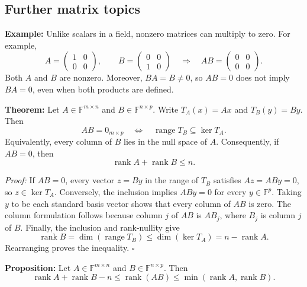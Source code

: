 \documentclass[a4paper,11pt,abstract=true]{scrartcl}
\theoremstyle{dotlessP}
\theoremstyle{dotlessS}
\theoremstyle{remark}
\theoremstyle{definition}
\begin{document}
\subsection{Further matrix topics}


\begin{example_box}
\textbf{Example:} Unlike
scalars in a field, nonzero matrices can multiply to zero. For example,
\[
A=\begin{pmatrix}1&0\\0&0\end{pmatrix},\qquad
B=\begin{pmatrix}0&0\\1&0\end{pmatrix}
\quad\Longrightarrow\quad
AB=\begin{pmatrix}0&0\\0&0\end{pmatrix}.
\]
Both $A$ and $B$ are nonzero. Moreover, $BA=B\neq0$, so $AB=0$
does not imply $BA=0$, even when both products are defined.
\end{example_box}

\begin{problem_box}
\textbf{Theorem:} Let
$A\in\mathbb{F}^{m\times n}$ and $B\in\mathbb{F}^{n\times p}$.
Write $T_A(x)=Ax$ and $T_B(y)=By$. Then
\[
AB=0_{m\times p}
\quad\Longleftrightarrow\quad
\operatorname{range}T_B\subseteq\ker T_A.
\]
Equivalently, every column of $B$ lies in the null space of $A$.
Consequently, if $AB=0$, then
\[
\operatorname{rank}A+\operatorname{rank}B\leq n.
\]

\end{problem_box}

\begin{claim_box}
\textit{Proof:} If $AB=0$, every vector $z=By$ in the range of $T_B$
satisfies $Az=ABy=0$, so $z\in\ker T_A$. Conversely, the inclusion
implies $ABy=0$ for every $y\in\mathbb{F}^p$. Taking $y$ to be each
standard basis vector shows that every column of $AB$ is zero.
The column formulation follows because column $j$ of $AB$ is $AB_j$,
where $B_j$ is column $j$ of $B$. Finally, the inclusion and
rank-nullity give
\[
\operatorname{rank}B=\dim(\operatorname{range}T_B)
\leq\dim(\ker T_A)=n-\operatorname{rank}A.
\]
Rearranging proves the inequality. \hfill$\square$
\end{claim_box}

\begin{problem_box}
\textbf{Proposition:} Let
$A\in\mathbb{F}^{m\times n}$ and $B\in\mathbb{F}^{n\times p}$.
Then
\[
\operatorname{rank}A+\operatorname{rank}B-n
\leq\operatorname{rank}(AB)
\leq\min(\operatorname{rank}A,\operatorname{rank}B).
\]
\end{problem_box}
\end{document}
